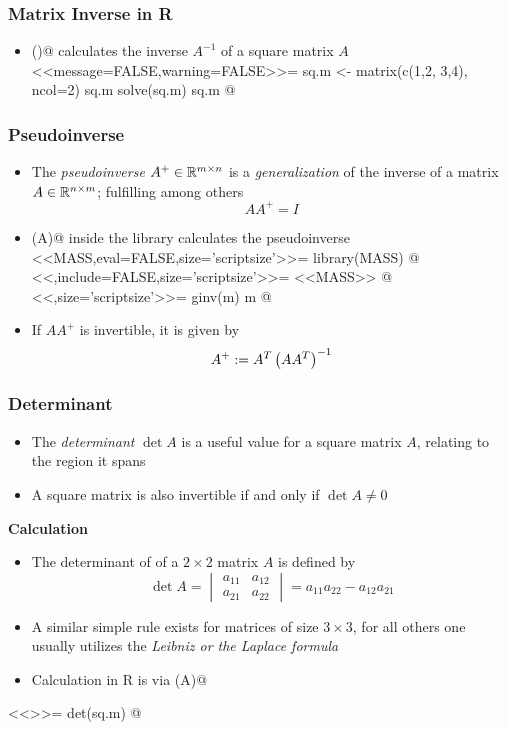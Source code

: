 \documentclass[%
  final,
  11pt, 
  show notes, %
  t, %
  fleqn, %
]{beamer}
\begin{document}
\begin{frame}[fragile]
  \frametitle{Matrix Inverse in R}
\begin{itemize}
\item \verb@solve()@ calculates the inverse $A^{-1}$ of a square matrix $A$
<<message=FALSE,warning=FALSE>>=
sq.m <- matrix(c(1,2, 3,4), ncol=2)
sq.m
solve(sq.m)
sq.m %
@
\end{itemize}
\end{frame}

\begin{frame}[fragile]
  \frametitle{Pseudoinverse}
\begin{itemize}
\item The \emph{pseudoinverse} $A^+ \in\mathbb{R}^{m \times n}$ is a \emph{generalization} of the inverse of a matrix $A \in\mathbb{R}^{n \times m}$; fulfilling among others
\begin{equation*}
A A^+ = I
\end{equation*}
\item \verb@ginv(A)@ inside the library \verb@MASS@ calculates the pseudoinverse 
<<MASS,eval=FALSE,size='scriptsize'>>=
library(MASS)
@
<<,include=FALSE,size='scriptsize'>>=
<<MASS>>
@
<<,size='scriptsize'>>=
ginv(m)
m %
@
\item If $A A^+$ is invertible, it is given by 
\begin{equation*}
A^+ := A^T \left(A A^T \right)^{-1}
\end{equation*}
\end{itemize}
\end{frame}

\begin{frame}[fragile]
  \frametitle{Determinant}
\begin{itemize}
\item The \emph{determinant} $\det A$ is a useful value for a square matrix $A$, relating to \eg the region it spans
\item A square matrix is also invertible if and only if $\det A \neq 0$
\end{itemize}
\textbf{Calculation}
\begin{itemize}
\item The determinant of of a $2 \times 2$ matrix $A$ is defined by
\begin{equation*} 
\det A = \begin{vmatrix} a_{11} & a_{12} \\
a_{21} & a_{22} \end{vmatrix} = a_{11} a_{22} - a_{12} a_{21}
\end{equation*}
\item A similar simple rule exists for matrices of size $3 \times 3$, for all others one usually utilizes the \emph{Leibniz or the Laplace formula}
\item Calculation in R is via \verb@det(A)@
\end{itemize}
<<>>=
det(sq.m)
@
\end{frame}
\end{document}
